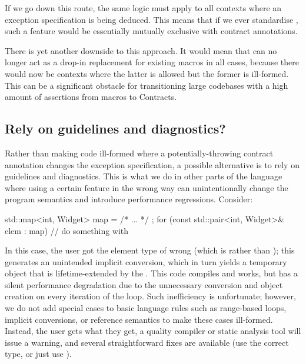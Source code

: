 If we go down this route, the same logic must apply to all contexts where an exception specification is being deduced. This means that if we ever standardise , such a feature would be essentially mutually exclusive with contract annotations.

There is yet another downside to this approach. It would mean that  can no longer act as a drop-in replacement for existing  macros in all cases, because there would now be contexts where the latter is allowed but the former is ill-formed. This can be a significant obstacle for transitioning large codebases with a high amount of assertions from macros to Contracts.

\subsection{Rely on guidelines and diagnostics?}

Rather than making code ill-formed where a potentially-throwing contract annotation changes the exception specification, a possible alternative is to rely on guidelines and diagnostics. This is what we do in other parts of the language where using a certain feature in the wrong way can unintentionally change the program semantics and introduce performance regressions. Consider:

\begin{codeblock}
std::map<int, Widget> map = { /* ... */ };
for (const std::pair<int, Widget>& elem : map)
  // do something with 
\end{codeblock}

In this case, the user got the element type of  wrong (which is  rather than ); this generates an unintended implicit conversion, which in turn yields a temporary object that is lifetime-extended by the . This code compiles and works, but has a silent performance degradation due to the unnecessary conversion and object creation on every iteration of the loop. Such inefficiency is unfortunate; however, we do not add special cases to basic language rules such as range-based  loops, implicit conversions, or reference semantics to make these cases ill-formed. Instead, the user gets what they get, a quality compiler or static analysis tool will issue a warning, and several straightforward fixes are available (use the correct type, or just use ).

